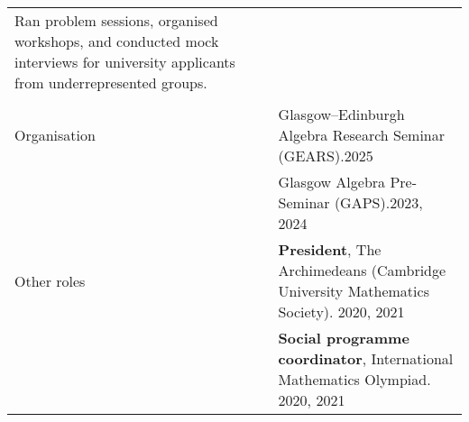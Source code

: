 \documentclass[10pt]{article}
\newcommand{\nextItem}{\\[0.25em]}
\newcommand{\nextSection}{\\[0.5em]}
\begin{document}
\begin{longtable}{>{\raggedleft\arraybackslash}p{0.8in}>{}p{0.05in}>{}p{5.7in}}
\begin{minipage}[c]{4.3in}
		      Ran problem sessions, organised workshops, and conducted mock interviews
		      for university applicants from underrepresented groups.
	      \end{minipage}          \\\\[-0.4em]
	Organisation
	 &  & Glasgow--Edinburgh Algebra Research Seminar (GEARS).\hfill 2025\nextItem%
	 &  & Glasgow Algebra Pre-Seminar (GAPS).\hfill 2023, 2024\nextSection%
	Other roles
	 &  & \textbf{President}, The Archimedeans (Cambridge University
	Mathematics Society). \hfill 2020, 2021\nextItem%
	 &  & \textbf{Social programme coordinator}, International Mathematics
	Olympiad. \hfill 2020, 2021
\end{longtable}
\end{document}
